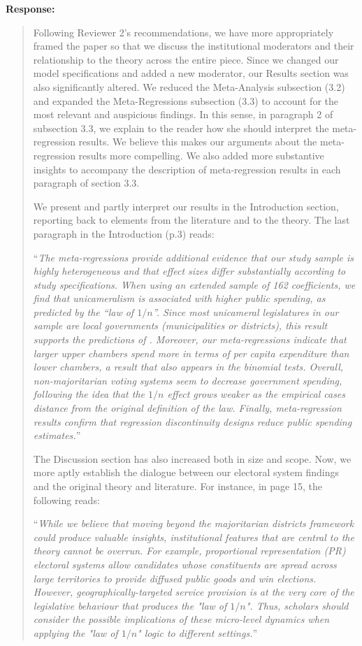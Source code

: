 \documentclass[a4paper,12pt]{article}
\begin{document}
\noindent \textbf{Response:} 
\begin{quote}
    Following Reviewer 2's recommendations, we have more appropriately framed the paper so that we discuss the institutional moderators and their relationship to the theory across the entire piece. Since we changed our model specifications and added a new moderator, our Results section was also significantly altered. We reduced the Meta-Analysis subsection (3.2) and expanded the Meta-Regressions subsection (3.3) to account for the most relevant and auspicious findings. In this sense, in paragraph 2 of subsection 3.3, we explain to the reader how she should interpret the meta-regression results. We believe this makes our arguments about the meta-regression results more compelling. We also added more substantive insights to accompany the description of meta-regression results in each paragraph of section 3.3. 
    
    We present and partly interpret our results in the Introduction section, reporting back to elements from the literature and to the theory. The last paragraph in the Introduction (p.3) reads:
    
    ``\textit{The meta-regressions provide additional evidence that our study sample is highly heterogeneous and that effect sizes differ substantially according to study specifications. When using an extended sample of 162 coefficients, we find that unicameralism is associated with higher public spending, as predicted by the ``law of $1/n$''. Since most unicameral legislatures in our sample are local governments (municipalities or districts), this result supports the predictions of \citet{weingast1981political}. Moreover, our meta-regressions indicate that larger upper chambers spend more in terms of per capita expenditure than lower chambers, a result that also appears in the binomial tests. Overall, non-majoritarian voting systems seem to decrease government spending, following the idea that the $1/n$ effect grows weaker as the empirical cases distance from the original definition of the law. Finally, meta-regression results confirm that regression discontinuity designs reduce public spending estimates.}''
    
    The Discussion section has also increased both in size and scope. Now, we more aptly establish the dialogue between our electoral system findings and the original theory and literature. For instance, in page 15, the following reads:
    
    ``\textit{While we believe that moving beyond the majoritarian districts framework could produce valuable insights, institutional features that are central to the theory cannot be overrun. For example, proportional representation (PR) electoral systems allow candidates whose constituents are spread across large territories to provide diffused public goods and win elections. However, geographically-targeted service provision is at the very core of the legislative behaviour that produces the "law of $1/n$". Thus, scholars should consider the possible implications of these micro-level dynamics when applying the "law of $1/n$" logic to different settings.}''
\end{quote}
\end{document}

